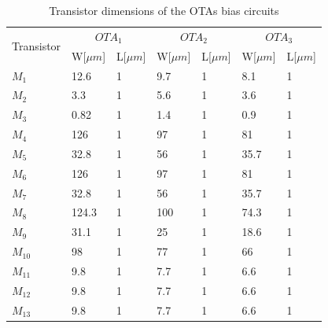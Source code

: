 \begin{table}[]
\centering
\caption{Transistor dimensions of the OTAs bias circuits}
\label{final_bias}
\begin{tabular}{l||l|l||l|l||l|l}
\hline
\multirow{2}{*}{Transistor} & \multicolumn{2}{c||}{$OTA_1$} & \multicolumn{2}{c||}{$OTA_2$} & \multicolumn{2}{c}{$OTA_3$}\\\cline{2-7}
                        &W[$\mu m$] & L[$\mu m$]& W[$\mu m$] & L[$\mu m$] & W[$\mu m$] & L[$\mu m$]\\\hline
            $M_1$       & 12.6 & 1 & 9.7 & 1 & 8.1 & 1\\
            $M_2$        & 3.3 & 1 & 5.6 & 1 & 3.6 & 1\\
            $M_3$        & 0.82 & 1 & 1.4 & 1 & 0.9 & 1\\
            $M_4$        & 126 & 1 & 97 & 1 & 81 & 1\\
            $M_5$        & 32.8 & 1 & 56 & 1 & 35.7 & 1\\
            $M_6$        & 126 & 1 & 97 & 1 & 81& 1\\
            $M_7$        & 32.8 & 1 & 56 & 1 & 35.7 & 1\\
            $M_8$        & 124.3 & 1 & 100 & 1 & 74.3 & 1\\
            $M_9$        & 31.1 & 1 & 25 & 1 & 18.6 & 1\\
            $M_{10}$        & 98 & 1 & 77 & 1 & 66 & 1\\
            $M_{11}$        & 9.8 & 1 & 7.7 & 1 & 6.6 & 1\\
            $M_{12}$        & 9.8 & 1 & 7.7 & 1 & 6.6 & 1\\
            $M_{13}$        & 9.8 & 1 & 7.7 & 1 & 6.6 & 1\\
\hline            
\end{tabular}
\end{table}
\clearpage

